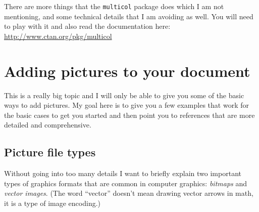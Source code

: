 \documentclass{article}
\begin{document}
There are more things that the \texttt{multicol} package does which I am not mentioning, and some technical details that I am avoiding as well.  You will need to play with it and also read the documentation here: \url{http://www.ctan.org/pkg/multicol}

\section{Adding pictures to your document}\label{sec:adding-pictures-to-your-document}
This is a really big topic and I will only be able to give you some of the basic ways to add pictures.  My goal here is to give you a few examples that work for the basic cases to get you started and then point you to references that are more detailed and comprehensive.  

\subsection{Picture file types}
Without going into too many details I want to briefly explain two important types of graphics formats that are common in computer graphics: \textit{bitmaps} and \textit{vector images}. (The word ``vector'' doesn't mean drawing vector arrows in math, it is a type of image encoding.)
\end{document}
